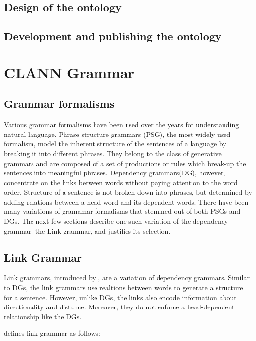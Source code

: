 \subsection{Design of the ontology}
\subsection{Development and publishing the ontology}


\section{CLANN Grammar}
\subsection{Grammar formalisms}

Various grammar formalisms have been used over the years for understanding natural language.  Phrase structure grammars (PSG), the most widely used formalism, model the inherent structure of the sentences of a language by breaking it into different phrases.  They belong to the class of generative grammars and are composed of a set of productions or rules which break-up the sentences into meaningful phrases.  Dependency grammars(DG), however, concentrate on the links between words without paying attention to the word order.  Structure of a sentence is not broken down into phrases, but determined by adding relations between a head word and its dependent words.  There have been many variations of gramamar formalisms that stemmed out of both PSGs and DGs.  The next few sections describe one such variation of the dependency grammar, the Link grammar, and justifies its selection.

\subsection{Link Grammar}
Link grammars, introduced by \cite{Sleator91}, are a variation of dependency grammars.  Similar to DGs, the link grammars use realtions between words to generate a structure for a sentence.  However, unlike DGs, the links also encode information about directionality and distance.  Moreover, they do not enforce a head-dependent relationship like the DGs.

\cite{Sleator91} defines link grammar as follows:

